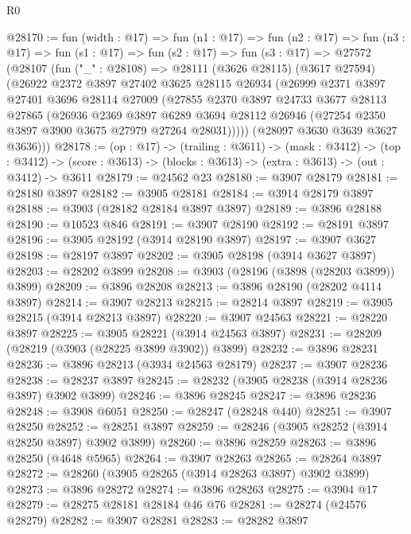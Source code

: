 \begin{lexlean}{R0}
\begin{coremodule}
@28170 := fun (width : @17) =>
  fun (n1 : @17) =>
  fun (n2 : @17) =>
  fun (n3 : @17) =>
  fun (s1 : @17) =>
  fun (s2 : @17) =>
  fun (s3 : @17) =>
  @27572
    (@28107
      (fun ("_" : @28108) =>
      @28111
        (@3626 @28115)
        (@3617 @27594)
        (@26922
          @2372
          @3897
          @27402
          @3625
          @28115
          @26934
          (@26999
            @2371
            @3897
            @27401
            @3696
            @28114
            @27009
            (@27855
              @2370
              @3897
              @24733
              @3677
              @28113
              @27865
              (@26936
                @2369
                @3897
                @6289
                @3694
                @28112
                @26946
                (@27254 @2350 @3897 @3900 @3675 @27979 @27264 @28031)))))
        (@28097 @3630 @3639 @3627 @3636)))
@28178 := (op : @17) ->
  (trailing : @3611) ->
  (mask : @3412) ->
  (top : @3412) -> (score : @3613) -> (blocks : @3613) -> (extra : @3613) -> (out : @3412) -> @3611
@28179 := @24562 @23
@28180 := @3907 @28179
@28181 := @28180 @3897
@28182 := @3905 @28181
@28184 := @3914 @28179 @3897
@28188 := @3903 (@28182 @28184 @3897 @3897)
@28189 := @3896 @28188
@28190 := @10523 @846
@28191 := @3907 @28190
@28192 := @28191 @3897
@28196 := @3905 @28192 (@3914 @28190 @3897)
@28197 := @3907 @3627
@28198 := @28197 @3897
@28202 := @3905 @28198 (@3914 @3627 @3897)
@28203 := @28202 @3899
@28208 := @3903 (@28196 (@3898 (@28203 @3899)) @3899)
@28209 := @3896 @28208
@28213 := @3896 @28190 (@28202 @4114 @3897)
@28214 := @3907 @28213
@28215 := @28214 @3897
@28219 := @3905 @28215 (@3914 @28213 @3897)
@28220 := @3907 @24563
@28221 := @28220 @3897
@28225 := @3905 @28221 (@3914 @24563 @3897)
@28231 := @28209 (@28219 (@3903 (@28225 @3899 @3902)) @3899)
@28232 := @3896 @28231
@28236 := @3896 @28213 (@3934 @24563 @28179)
@28237 := @3907 @28236
@28238 := @28237 @3897
@28245 := @28232 (@3905 @28238 (@3914 @28236 @3897) @3902 @3899)
@28246 := @3896 @28245
@28247 := @3896 @28236
@28248 := @3908 @6051
@28250 := @28247 (@28248 @440)
@28251 := @3907 @28250
@28252 := @28251 @3897
@28259 := @28246 (@3905 @28252 (@3914 @28250 @3897) @3902 @3899)
@28260 := @3896 @28259
@28263 := @3896 @28250 (@4648 @5965)
@28264 := @3907 @28263
@28265 := @28264 @3897
@28272 := @28260 (@3905 @28265 (@3914 @28263 @3897) @3902 @3899)
@28273 := @3896 @28272
@28274 := @3896 @28263
@28275 := @3904 @17
@28279 := @28275 @28181 @28184 @46 @76
@28281 := @28274 (@24576 @28279)
@28282 := @3907 @28281
@28283 := @28282 @3897

\end{coremodule}
\end{lexlean}
